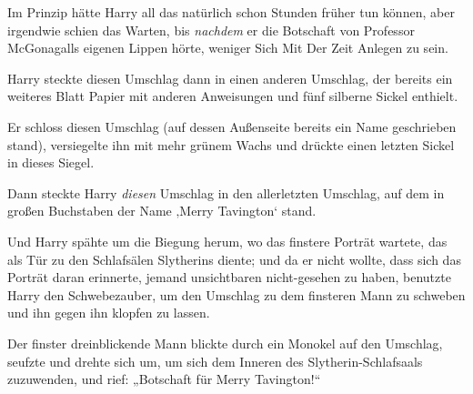 Im Prinzip hätte Harry all das natürlich schon Stunden früher tun können, aber irgendwie schien das Warten, bis \emph{nachdem} er die Botschaft von Professor McGonagalls eigenen Lippen hörte, weniger Sich Mit Der Zeit Anlegen zu sein.

Harry steckte diesen Umschlag dann in einen anderen Umschlag, der bereits ein weiteres Blatt Papier mit anderen Anweisungen und fünf silberne Sickel enthielt.

Er schloss diesen Umschlag (auf dessen Außenseite bereits ein Name geschrieben stand), versiegelte ihn mit mehr grünem Wachs und drückte einen letzten Sickel in dieses Siegel.

Dann steckte Harry \emph{diesen} Umschlag in den allerletzten Umschlag, auf dem in großen Buchstaben der Name ‚Merry Tavington‘ stand.

Und Harry spähte um die Biegung herum, wo das finstere Porträt wartete, das als Tür zu den Schlafsälen Slytherins diente; und da er nicht wollte, dass sich das Porträt daran erinnerte, jemand unsichtbaren nicht-gesehen zu haben, benutzte Harry den Schwebezauber, um den Umschlag zu dem finsteren Mann zu schweben und ihn gegen ihn klopfen zu lassen.

Der finster dreinblickende Mann blickte durch ein Monokel auf den Umschlag, seufzte und drehte sich um, um sich dem Inneren des Slytherin-Schlafsaals zuzuwenden, und rief:
„Botschaft für Merry Tavington!“

